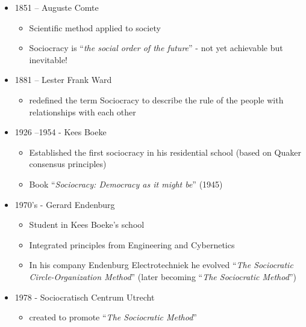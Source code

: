 \begin{itemize}
\item 1851 – Auguste Comte

\begin{itemize}
\item Scientific method applied to society

\item Sociocracy is “\emph{the social order of the future}” - not yet achievable but inevitable!

\end{itemize}

\item 1881 – Lester Frank Ward

\begin{itemize}
\item redefined the term Sociocracy to describe the rule of the people with relationships with each other

\end{itemize}

\item 1926 --1954 - Kees Boeke

\begin{itemize}
\item Established the first sociocracy in his residential school (based on Quaker consensus principles)

\item Book “\emph{Sociocracy: Democracy as it might be}” (1945)

\end{itemize}

\item 1970's - Gerard Endenburg

\begin{itemize}
\item Student in Kees Boeke’s school

\item Integrated principles from Engineering and Cybernetics

\item In his company Endenburg Electrotechniek he evolved “\emph{The Sociocratic Circle-Organization Method}” (later becoming ``\emph{The Sociocratic Method}'')

\end{itemize}

\item 1978 - Sociocratisch Centrum Utrecht

\begin{itemize}
\item created to promote ``\emph{The Sociocratic Method}''


\end{itemize}
\end{itemize}
